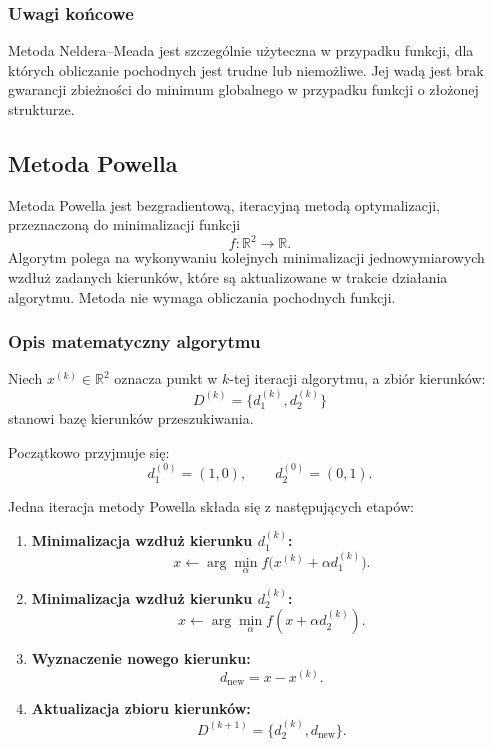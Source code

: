 \documentclass[10pt,a4paper]{article}
\begin{document}
\subsubsection{Uwagi końcowe}

Metoda Neldera--Meada jest szczególnie użyteczna w przypadku funkcji,
dla których obliczanie pochodnych jest trudne lub niemożliwe. Jej wadą
jest brak gwarancji zbieżności do minimum globalnego w przypadku funkcji
o złożonej strukturze.


\subsection{Metoda Powella}

Metoda Powella jest bezgradientową, iteracyjną metodą optymalizacji,
przeznaczoną do minimalizacji funkcji
\[
f:\mathbb{R}^2 \to \mathbb{R}.
\]
Algorytm polega na wykonywaniu kolejnych minimalizacji jednowymiarowych
wzdłuż zadanych kierunków, które są aktualizowane w trakcie działania
algorytmu. Metoda nie wymaga obliczania pochodnych funkcji.



\subsubsection{Opis matematyczny algorytmu}

Niech $x^{(k)} \in \mathbb{R}^2$ oznacza punkt w $k$-tej iteracji algorytmu,
a zbiór kierunków:
\[
D^{(k)} = \{ d_1^{(k)}, d_2^{(k)} \}
\]
stanowi bazę kierunków przeszukiwania.

Początkowo przyjmuje się:
\[
d_1^{(0)} = (1,0), \qquad d_2^{(0)} = (0,1).
\]

Jedna iteracja metody Powella składa się z następujących etapów:

\begin{enumerate}
\item \textbf{Minimalizacja wzdłuż kierunku $d_1^{(k)}$:}
\[
x \leftarrow \arg\min_{\alpha} f\bigl(x^{(k)} + \alpha d_1^{(k)}\bigr).
\]

\item \textbf{Minimalizacja wzdłuż kierunku $d_2^{(k)}$:}
\[
x \leftarrow \arg\min_{\alpha} f(x + \alpha d_2^{(k)}).
\]

\item \textbf{Wyznaczenie nowego kierunku:}
\[
d_{\text{new}} = x - x^{(k)}.
\]

\item \textbf{Aktualizacja zbioru kierunków:}
\[
D^{(k+1)} = \{ d_2^{(k)}, d_{\text{new}} \}.
\]
\end{enumerate}
\end{document}
